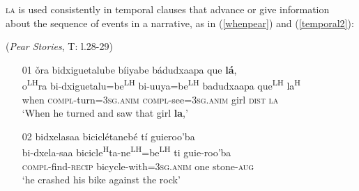 \textsc{la} is used consistently in temporal clauses that advance or give information about the sequence of events in a narrative, as in (\ref{whenpear}) and (\ref{temporal2}):

\ea\label{whenpear} (\textit{Pear Stories}, T: l.28-29)
\begin{itemize}
\item[01]
\glll \v{o}ra bidxiguetalube b\'{i}iyabe b\'{a}dudxaapa que \textbf{l\'{a}},  \\
o\textsuperscript{LH}ra bi-dxiguetalu=be\textsuperscript{LH} bi-uuya=be\textsuperscript{LH} badudxaapa que\textsuperscript{LH} la\textsuperscript{H}  \\
when \textsc{compl}-turn=3\textsc{sg.anim} \textsc{compl}-see=3\textsc{sg.anim} girl \textsc{dist} \textsc{la}  \\
\glt `When he turned and saw that girl \textbf{la},'


\item[02]
\glll bidxelasaa bicicl\'{e}taneb\'{e} t\'{i} guieroo'ba  \\
bi-dxela-saa bicicle\textsuperscript{H}ta-ne\textsuperscript{LH}=be\textsuperscript{LH} ti guie-roo'ba  \\
\textsc{compl}-find-\textsc{recip} bicycle-with=3\textsc{sg.anim} one stone-\textsc{aug}  \\
\glt `he crashed his bike against the rock' 

\end{itemize}
\z

